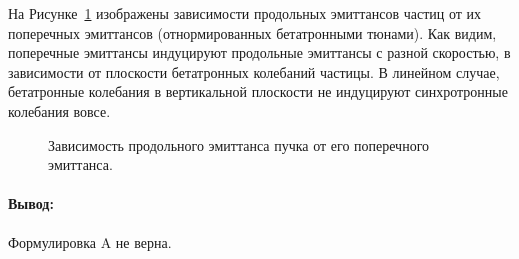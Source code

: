 На Рисунке~\ref{fig:long_emitt_vs_trans_emitt} изображены зависимости продольных эмиттансов частиц от их поперечных эмиттансов (отнормированных бетатронными тюнами). Как видим, поперечные эмиттансы индуцируют продольные эмиттансы с разной скоростью, в зависимости от плоскости бетатронных колебаний частицы. В линейном случае, бетатронные колебания в вертикальной плоскости не индуцируют синхротронные колебания вовсе.
\begin{figure}[H]
	\centering
	\caption{Зависимость продольного эмиттанса пучка от его поперечного эмиттанса.\label{fig:long_emitt_vs_trans_emitt}}
\end{figure}

\paragraph{Вывод:} Формулировка A не верна. 
